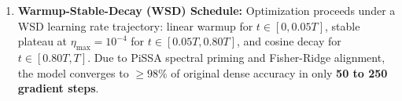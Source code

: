 \begin{enumerate}
\begin{itemize}
        \item $\mathcal{L}_3$ (Attention KD): $\operatorname{KL}(\mat{A}_s \,\|\, \mat{A}_t)$ preserving head focus distributions;
        \item $\mathcal{L}_4$ (Angular Cosine MSE): $1 - \frac{\langle \vect{h}_s, \vect{h}_t \rangle}{\|\vect{h}_s\|_2 \|\vect{h}_t\|_2}$ preserving feature directional orientation;
        \item $\mathcal{L}_5$ (Stiefel Orthogonality): $\|\mat{U}_r^\top \mat{U}_r - \mat{I}_r\|_F^2 + \|\mat{V}_r^\top \mat{V}_r - \mat{I}_r\|_F^2$ preventing low-rank subspace collapse;
        \item $\mathcal{L}_6$ (Latent Entropy): $\max\big(0, \, \gamma_{\text{target}} - \mathcal{H}(\softmax(\vect{z}_s))\big)$ maintaining representation entropy.
    \end{itemize}
    \item \textbf{Warmup-Stable-Decay (WSD) Schedule:} Optimization proceeds under a WSD learning rate trajectory: linear warmup for $t \in [0, 0.05 T]$, stable plateau at $\eta_{\max} = 10^{-4}$ for $t \in [0.05 T, 0.80 T]$, and cosine decay for $t \in [0.80 T, T]$. Due to PiSSA spectral priming and Fisher-Ridge alignment, the model converges to $\ge 98\%$ of original dense accuracy in only \textbf{50 to 250 gradient steps}.
\end{enumerate}

